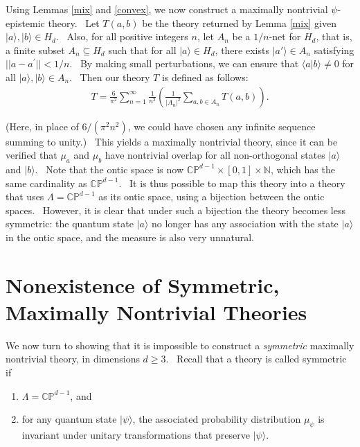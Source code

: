 \documentclass[letterpaper,11pt]{article}
\begin{document}
Using Lemmas \ref{mix} and \ref{convex}, we now construct a maximally
nontrivial $\psi$-epistemic theory. \ Let $T(a,b)$ be the theory
returned by Lemma \ref{mix} given $ | a \rangle , | b
\rangle \in H_d$. \ Also, for all positive integers $n$, let $A_n$ be a $%
1/n$-net for $H_d$, that is, a finite subset $A_n\subseteq H_d$ such that
for all $ | a \rangle \in H_d$, there exists $ | a'
\rangle \in A_n$ satisfying $||a-a^{\prime }||<1/n$. \ By making
small perturbations, we can ensure that $ \langle a | b \rangle
\neq 0$ for all $ | a \rangle , | b \rangle \in A_n$. \ Then our theory $T$ is defined as follows:
\begin{eqnarray}
T = \frac{6}{\pi^2}\sum_{n=1}^{\infty}\frac{1}{n^2}\left(\frac{1}{|A_n|^2}%
\sum_{a,b\in A_n} T(a,b)\right).
\end{eqnarray}

\noindent (Here, in place of $6/(\pi^{2} n^{2})$, we could have chosen any infinite sequence summing to unity.) \ This yields a maximally nontrivial theory, since it can be verified that $%
\mu_{a}$ and $\mu_{b}$ have nontrivial overlap for all non-orthogonal
states $ | a \rangle $ and $ | b \rangle $. \ Note
that the ontic space is now $\mathbb{CP}^{d-1}\times [0,1]\times \mathbb{N}$, which has the same
cardinality as $\mathbb{CP}^{d-1}$. \ It is thus possible to map this theory into a theory
that uses $\Lambda=\mathbb{CP}^{d-1}$ as its ontic space, using a bijection between the
ontic spaces. \ However, it is clear that under such a bijection the theory
becomes less symmetric: the quantum state $ | a \rangle $ no
longer has any association with the state $ | a \rangle $ in the
ontic space, and the measure is also very unnatural.

\section{Nonexistence of Symmetric, Maximally Nontrivial Theories}

\label{nonexistence} We now turn to showing that it is impossible to
construct a \textit{symmetric} maximally nontrivial theory, in dimensions $%
d\geq 3$. \ Recall that a theory is called symmetric if

\begin{enumerate}
\item $\Lambda=\mathbb{CP}^{d-1}$, and

\item for any quantum state $ | \psi \rangle $, the associated
probability distribution $\mu_{\psi}$ is invariant under unitary
transformations that preserve $ | \psi \rangle $.
\end{enumerate}
\end{document}
